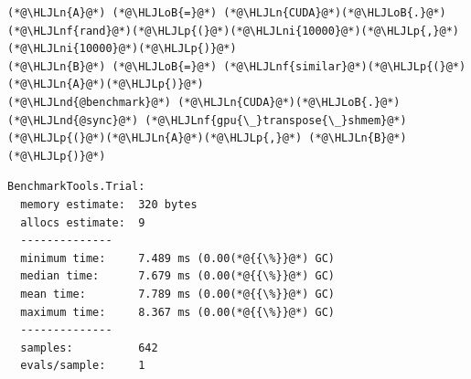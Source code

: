 \documentclass[12pt,a4paper]{article}
\newcommand{\HLJLn}[1]{#1}
\newcommand{\HLJLnd}[1]{\textcolor[RGB]{214,102,97}{#1}}
\newcommand{\HLJLnf}[1]{\textcolor[RGB]{66,102,213}{#1}}
\newcommand{\HLJLni}[1]{\textcolor[RGB]{59,151,46}{#1}}
\newcommand{\HLJLoB}[1]{\textcolor[RGB]{102,102,102}{\textbf{#1}}}
\newcommand{\HLJLp}[1]{#1}
\begin{document}
\begin{lstlisting}
(*@\HLJLn{A}@*) (*@\HLJLoB{=}@*) (*@\HLJLn{CUDA}@*)(*@\HLJLoB{.}@*)(*@\HLJLnf{rand}@*)(*@\HLJLp{(}@*)(*@\HLJLni{10000}@*)(*@\HLJLp{,}@*) (*@\HLJLni{10000}@*)(*@\HLJLp{)}@*)
(*@\HLJLn{B}@*) (*@\HLJLoB{=}@*) (*@\HLJLnf{similar}@*)(*@\HLJLp{(}@*)(*@\HLJLn{A}@*)(*@\HLJLp{)}@*)
(*@\HLJLnd{@benchmark}@*) (*@\HLJLn{CUDA}@*)(*@\HLJLoB{.}@*)(*@\HLJLnd{@sync}@*) (*@\HLJLnf{gpu{\_}transpose{\_}shmem}@*)(*@\HLJLp{(}@*)(*@\HLJLn{A}@*)(*@\HLJLp{,}@*) (*@\HLJLn{B}@*)(*@\HLJLp{)}@*)
\end{lstlisting}

\begin{lstlisting}
BenchmarkTools.Trial: 
  memory estimate:  320 bytes
  allocs estimate:  9
  --------------
  minimum time:     7.489 ms (0.00(*@{{\%}}@*) GC)
  median time:      7.679 ms (0.00(*@{{\%}}@*) GC)
  mean time:        7.789 ms (0.00(*@{{\%}}@*) GC)
  maximum time:     8.367 ms (0.00(*@{{\%}}@*) GC)
  --------------
  samples:          642
  evals/sample:     1
\end{lstlisting}
\end{document}

